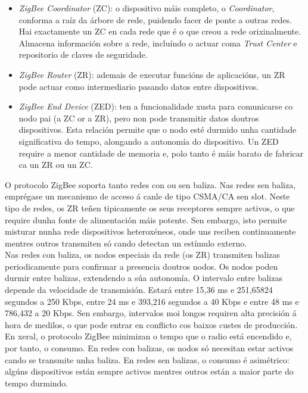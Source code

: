 \begin{itemize}
 \item \textit{ZigBee Coordinator} (ZC): o dispositivo máis completo, o
       \textit{Coordinator}, conforma a raíz da árbore de rede, puidendo facer
       de ponte a outras redes. Hai exactamente un ZC en cada rede que é o que
       creou a rede orixinalmente. Almacena información sobre a rede, incluíndo
       o actuar coma \textit{Trust Center} e repositorio de claves de
       seguridade.
 \item \textit{ZigBee Router} (ZR): ademais de executar funcións de
       aplicacións, un ZR pode actuar como intermediario pasando datos entre
       dispositivos.
 \item \textit{ZigBee End Device} (ZED): ten a funcionalidade xusta para
       comunicarse co nodo pai (a ZC or a ZR), pero non pode transmitir datos
       doutros dispositivos. Esta relación permite que o nodo esté durmido unha
       cantidade significativa do tempo, alongando a autonomía do dispositivo.
       Un ZED require a menor cantidade de memoria e, polo tanto é máis barato
       de fabricar ca un ZR ou un ZC.
\end{itemize}

O protocolo ZigBee soporta tanto redes con ou sen baliza. Nas redes sen baliza,
emprégase un mecanismo de acceso á canle de tipo CSMA/CA sen slot. Neste tipo
de redes, os ZR teñen tipicamente os seus receptores sempre activos, o que
require dunha fonte de alimentación máis potente. Sen embargo, isto permite
misturar nunha rede dispositivos heteroxéneos, onde uns reciben continuamente
mentres outros transmiten só cando detectan un estímulo externo. \\

Nas redes con baliza, os nodos especiais da rede (os ZR) transmiten balizas
periodicamente para confirmar a presencia doutros nodos. Os nodos poden durmir
entre balizas, extendendo a súa autonomía. O intervalo entre balizas depende da
velocidade de transmisión. Estará entre 15,36 ms e 251,65824 segundos a
250 Kbps, entre 24 ms e 393,216 segundos a 40 Kbps e entre 48 ms e 786,432 a
20 Kbps. Sen embargo, intervalos moi longos requiren alta precisión á hora de
medilos, o que pode entrar en conflicto cos baixos custes de producción. \\

En xeral, o protocolo ZigBee minimizan o tempo que o radio está encendido e,
por tanto, o consumo. En redes con balizas, os nodos só necesitan estar activos
cando se transmite unha baliza. En redes sen balizas, o consumo é asimétrico:
algúns dispositivos están sempre activos mentres outros están a maior parte do
tempo durmindo. \\

